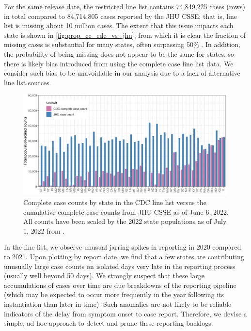 \documentclass{article}
\begin{document}
For the same release date, the restricted line list contains 74,849,225 cases
(rows) in total compared to 84,714,805 cases reported by the JHU CSSE; that is,
line list is missing about 10 million cases. The
extent that this issue impacts each state is shown in
\autoref{fig:prop_cc_cdc_vs_jhu}, from which it is clear the fraction of missing
cases is substantial for many states, often surpassing 50\%
\citep{jahja2022real}. In addition, the probability of being missing does not
appear to be the same for states, so there is likely bias introduced from using
the complete case line list data. We consider such bias to be unavoidable in our
analysis due to a lack of alternative line list sources.

\begin{figure}[!tb]
\centering
    \includegraphics[width=0.99\textwidth]{prop_cc_cdc_vs_jhu.pdf} 
    \caption{Complete case counts by state in the CDC line list versus the 
    cumulative complete case counts from JHU CSSE as of June 6, 2022.
     All counts have been scaled by the 2022 state populations as of
     July 1, 2022 from \citet{uscensus2022annual}.}
    \label{fig:prop_cc_cdc_vs_jhu}
\end{figure}

In the line list, we observe unusual jarring spikes in reporting in 2020 compared
to 2021. Upon plotting by report date, we find that a few states are
contributing unusually large case counts on isolated days very late in the
reporting process (usually well beyond 50 days). We strongly suspect that
these large accumulations of cases over time are due breakdowns of the reporting
pipeline (which may be expected to occur more frequently in the year following
its instantiation than later in time). Such anomalies are not likely to be reliable
indicators of the delay from symptom onset to case report. Therefore, we devise
a simple, ad hoc approach to detect and prune these reporting backlogs. 
\end{document}
